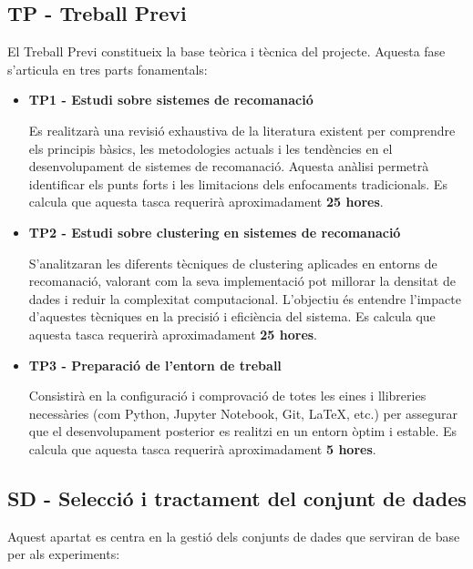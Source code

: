 \documentclass[a4paper,12pt]{report}
\begin{document}
\subsection{TP - Treball Previ}

El Treball Previ constitueix la base teòrica i tècnica del projecte.
Aquesta fase s’articula en tres parts fonamentals:

\begin{itemize}
    \item \textbf{TP1 - Estudi sobre sistemes de recomanació}
    
    Es realitzarà una revisió exhaustiva de la literatura existent per comprendre els principis bàsics, les metodologies actuals i les tendències en el desenvolupament de sistemes de recomanació.
    Aquesta anàlisi permetrà identificar els punts forts i les limitacions dels enfocaments tradicionals.
    Es calcula que aquesta tasca requerirà aproximadament \textbf{25 hores}.

    \item \textbf{TP2 - Estudi sobre clustering en sistemes de recomanació}
    
    S’analitzaran les diferents tècniques de clustering aplicades en entorns de recomanació, valorant com la seva implementació pot millorar la densitat de dades i reduir la complexitat computacional.
    L’objectiu és entendre l’impacte d’aquestes tècniques en la precisió i eficiència del sistema.
    Es calcula que aquesta tasca requerirà aproximadament \textbf{25 hores}.

    \item \textbf{TP3 - Preparació de l'entorn de treball}

    Consistirà en la configuració i comprovació de totes les eines i llibreries necessàries (com Python, Jupyter Notebook, Git, LaTeX, etc.) per assegurar que el desenvolupament posterior es realitzi en un entorn òptim i estable.
    Es calcula que aquesta tasca requerirà aproximadament \textbf{5 hores}.
\end{itemize}

\subsection{SD - Selecció i tractament del conjunt de dades}

Aquest apartat es centra en la gestió dels conjunts de dades que serviran de base per als experiments:
\end{document}
